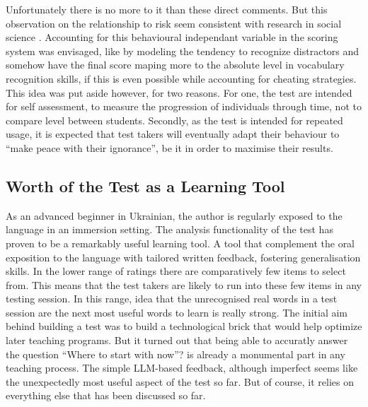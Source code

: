 Unfortunately there is no more to it than these direct comments. But this observation on the relationship to risk seem consistent with research in social science \parencite{wang_does_2023}. Accounting for this behavioural independant variable in the scoring system was envisaged, like by modeling the tendency to recognize distractors and somehow have the final score maping more to the absolute level in vocabulary recognition skills, if this is even possible while accounting for cheating strategies. This idea was put aside however, for two reasons. For one, the test are intended for self assessment, to measure the progression of individuals through time, not to compare level between students. Secondly, as the test is intended for repeated usage, it is expected that test takers will eventually adapt their behaviour to ``make peace with their ignorance'', be it in order to maximise their results.

\subsection{Worth of the Test as a Learning Tool}
As an advanced beginner in Ukrainian, the author is regularly exposed to the language in an immersion setting. The analysis functionality of the test has proven to be a remarkably useful learning tool. A tool that complement the oral exposition to the language with tailored written feedback, fostering generalisation skills. In the lower range of ratings there are comparatively few items to select from. This means that the test takers are likely to run into these few items in any testing session. In this range, idea that the unrecognised real words in a test session are the next most useful words to learn is really strong. The initial aim behind building a test was to build a technological brick that would help optimize later teaching programs. But it turned out that being able to accuratly answer the question ``Where to start with now''? is already a monumental part in any teaching process. The simple LLM-based feedback, although imperfect seems like the unexpectedly most useful aspect of the test so far. But of course, it relies on everything else that has been discussed so far.

